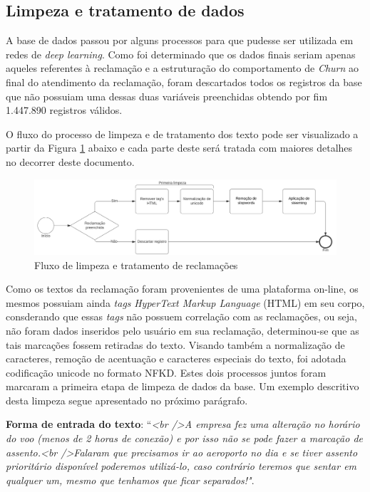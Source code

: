\documentclass[12pt]{article}
\begin{document}
\subsection{Limpeza e tratamento de dados}\label{sec:clean}

A base de dados passou por alguns processos para que pudesse ser utilizada em redes de \emph{deep learning}. Como foi determinado que os dados finais seriam apenas aqueles referentes à reclamação e a estruturação do comportamento de \emph{Churn} ao final do atendimento da reclamação, foram descartados todos os registros da base que não possuiam uma dessas duas variáveis preenchidas obtendo por fim 1.447.890 registros válidos.

O fluxo do processo de limpeza e de tratamento dos texto pode ser visualizado a partir da Figura \ref{fig:fluxo1} abaixo e cada parte deste será tratada com maiores detalhes no decorrer deste documento.

\begin{figure}[ht]
\centering
\includegraphics[scale=0.25]{fig/fluxo.png}
\caption{Fluxo de limpeza e tratamento de reclamações}
\label{fig:fluxo1}
\end{figure}

Como os textos da reclamação foram provenientes de uma plataforma on-line, os mesmos possuiam ainda \textit{tags} \emph{HyperText Markup Language} (HTML) em seu corpo, consderando que essas \textit{tags} não possuem correlação com as reclamações, ou seja, não foram dados inseridos pelo usuário em sua reclamação, determinou-se que as tais marcações fossem retiradas do texto. Visando também a normalização de caracteres, remoção de acentuação e caracteres especiais do texto, foi adotada codificação unicode no formato NFKD. Estes dois processos juntos foram marcaram a primeira etapa de limpeza de dados da base. Um exemplo descritivo desta limpeza segue apresentado no próximo parágrafo.

\textbf{Forma de entrada do texto}: ``\emph{\textless{}br /\textgreater{}A empresa fez uma alteração no horário do voo (menos de 2 horas de conexão) e por isso não se pode fazer a marcação de assento.\textless{}br /\textgreater{}Falaram que precisamos ir ao aeroporto no dia e se tiver assento prioritário disponível poderemos utilizá-lo, caso contrário teremos que sentar em qualquer um, mesmo que tenhamos que ficar separados!"}. 
\end{document}
